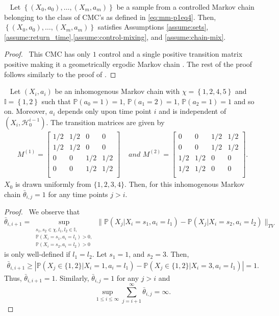 \documentclass[opre,sglanonrev]{informs4}
\numberwithin{equation}{section}
\newcommand{\pow}[1]{^{(#1)}}
\newcommand{\lp}{\left(}
\newcommand{\rp}{\right)}
\newcommand{\lc}{\left\{}
\newcommand{\rc}{\right\}}
\newcommand{\History}{\mathcal{H}}
\newcommand{\Ibb}{\mathbb{I}}
\newcommand{\Pbb}{\mathbb{P}}
\newcommand{\indexeddata}{\left\{(X_0,a_0),\dots,(X_m,a_m)\right\}}
\newcommand{\prob}{\Pbb}
\newcommand{\probl}{\prob}
\begin{document}
\begin{APPENDICES}
\begin{lemma}~\label{lemma:mm-p1cond}
Let $\indexeddata$ be a sample from a controlled Markov chain belonging to the class of CMC's as defined in \cref{eq:mm-p1eq4}. Then, $\indexeddata$ satisfies Assumptions \ref{assume:sets},\ref{assume:return_time},\ref{assume:control-mixing}, and \ref{assume:chain-mix}. 
\end{lemma}
\begin{proof} \
This CMC has only $1$ control and a single positive transition matrix positive making it a geometrically ergodic Markov chain \cite[Theorem 15.0.1]{meyntweedie}. The rest of the proof follows similarly to the proof of .
\end{proof}
\begin{lemma}~\label{lemma:counter-example} Let $(X_i,a_i)$ be an inhomogenous Markov chain with $\chi=\lc1,2,4,5\rc$ and $\Ibb=\lc1,2\rc$ such that $\prob(a_0=1)=1$, $\prob(a_1=2)=1$, $\prob(a_2=1)=1$ and so on. Moreover, $a_i$ depends only upon time point $i$ and is independent of $(X_i,\History_0^{i-1})$. The transition matrices are given by
\begin{align*}
    M\pow{1}=\begin{bmatrix}
    1/2 & 1/2 & 0 & 0\\
    1/2 & 1/2 & 0 & 0\\
    0 & 0 & 1/2 & 1/2\\
    0 & 0 & 1/2 & 1/2\\
    \end{bmatrix} & \textit{ and } M\pow{2}=\begin{bmatrix}
    0 & 0 & 1/2 & 1/2\\
    0 & 0 & 1/2 & 1/2\\
    1/2 & 1/2 & 0 & 0\\
    1/2 & 1/2 & 0 & 0\\
    \end{bmatrix}.
\end{align*}
$X_0$ is drawn uniformly from $\{1,2,3,4\}$. Then, for this inhomogenous Markov chain $\bar \theta_{i,j}=1$ for any time points $j>i$.
\end{lemma}
\begin{proof} \ 
We observe that 
\[
\bar \theta_{i,i+1} = \underset{\substack{s_1,s_2\in\chi,l_1,l_2\in \Ibb,\\ \prob(X_i=s_1,a_i=l_1)>0,\\ \prob(X_i=s_2,a_i=l_2)>0  }}{\sup} \| \probl\lp X_j|X_i=s_1,a_i=l_1\rp-\probl\lp X_j|X_i=s_2,a_i=l_2\rp \|_{TV}
\]
is only well-defined if $l_1=l_2$. Let $s_1=1$, and $s_2=3$. Then,
\begin{align*}
    \bar \theta_{i,i+1} \geq  | \prob\lp X_j\in\{1,2\}|X_i=1,a_i=l_1\rp-\prob\lp X_j\in\{1,2\}|X_i=3,a_i=l_1\rp | = 1.
\end{align*}
Thus, $\bar \theta_{i,i+1}=1$. Similarly, $\bar \theta_{i,j}=1$ for any $j>i$ and 
\[
\sup_{1\leq i\leq \infty}\sum_{j=i+1}^\infty \bar \theta_{i,j}=\infty.
\]
\end{proof}


\end{APPENDICES}
\end{document}
